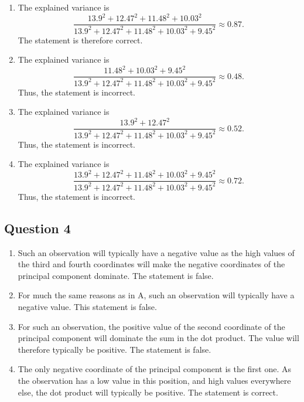 \documentclass[twoside,11pt]{article}
\begin{document}
\begin{enumerate}[label=\Alph*.]
	\item The explained variance is
	\[
		\frac{13.9^2 + 12.47^2 + 11.48^2 + 10.03^2}{13.9^2 + 12.47^2 + 11.48^2 + 10.03^2 + 9.45^2} \approx 0.87.
	\]
	The statement is therefore correct.

	\item The explained variance is
	\[
		\frac{11.48^2 + 10.03^2 + 9.45^2}{13.9^2 + 12.47^2 + 11.48^2 + 10.03^2 + 9.45^2} \approx 0.48.
	\]
	Thus, the statement is incorrect.

	\item The explained variance is
	\[
		\frac{13.9^2 + 12.47^2}{13.9^2 + 12.47^2 + 11.48^2 + 10.03^2 + 9.45^2} \approx 0.52.
	\]
	Thus, the statement is incorrect.

	\item The explained variance is
	\[
		\frac{13.9^2 + 12.47^2 + 11.48^2 + 10.03^2 + 9.45^2}{13.9^2 + 12.47^2 + 11.48^2 + 10.03^2 + 9.45^2} \approx 0.72.
	\]
	Thus, the statement is incorrect.

\end{enumerate}

\subsection*{Question 4}

\begin{enumerate}[label=\Alph*.]
	\item Such an observation will typically have a negative value as the high values of the third and fourth coordinates will make the negative coordinates of the principal component dominate. The statement is false.

	\item For much the same reasons as in A, such an observation will typically have a negative value. This statement is false.

	\item For such an observation, the positive value of the second coordinate of the principal component will dominate the sum in the dot product. The value will therefore typically be positive. The statement is false.

	\item The only negative coordinate of the principal component is the first one. As the observation has a low value in this position, and high values everywhere else, the dot product will typically be positive. The statement is correct.
	\end{enumerate}
\end{document}
